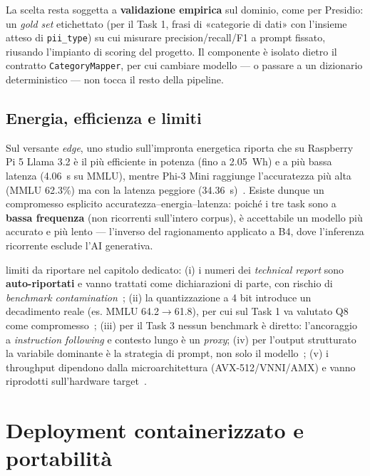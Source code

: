 La scelta resta soggetta a \textbf{validazione empirica} sul dominio, come per Presidio: un \textit{gold set} etichettato (per il Task 1, frasi di «categorie di dati» con l'insieme atteso di \texttt{pii\_type}) su cui misurare precision/recall/F1 a prompt fissato, riusando l'impianto di scoring del progetto. Il componente è isolato dietro il contratto \texttt{CategoryMapper}, per cui cambiare modello --- o passare a un dizionario deterministico --- non tocca il resto della pipeline.

\subsection{Energia, efficienza e limiti}
\label{sub:slm-energia-limiti}

Sul versante \textit{edge}, uno studio sull'impronta energetica riporta che su Raspberry Pi 5 Llama 3.2 è il più efficiente in potenza (fino a 2.05~Wh) e a più bassa latenza (4.06~s su MMLU), mentre Phi-3 Mini raggiunge l'accuratezza più alta (MMLU 62.3\%) ma con la latenza peggiore (34.36~s)~\cite{edgeenergy2025slm}. Esiste dunque un compromesso esplicito accuratezza--energia--latenza: poiché i tre task sono a \textbf{bassa frequenza} (non ricorrenti sull'intero corpus), è accettabile un modello più accurato e più lento --- l'inverso del ragionamento applicato a B4, dove l'inferenza ricorrente esclude l'AI generativa.

limiti da riportare nel capitolo dedicato: (i) i numeri dei \textit{technical report} sono \textbf{auto-riportati} e vanno trattati come dichiarazioni di parte, con rischio di \textit{benchmark contamination}~\cite{abdin2024phi4}; (ii) la quantizzazione a 4 bit introduce un decadimento reale (es. MMLU 64.2$\rightarrow$61.8), per cui sul Task 1 va valutato Q8 come compromesso~\cite{mobilequant2025}; (iii) per il Task 3 nessun benchmark è diretto: l'ancoraggio a \textit{instruction following} e contesto lungo è un \textit{proxy}; (iv) per l'output strutturato la variabile dominante è la strategia di prompt, non solo il modello~\cite{tenckhoff2026llmstructbench}; (v) i throughput dipendono dalla microarchitettura (AVX-512/VNNI/AMX) e vanno riprodotti sull'hardware target~\cite{ondevice2025systematic}.

\section{Deployment containerizzato e portabilità}
\label{sec:containerizzazione}

